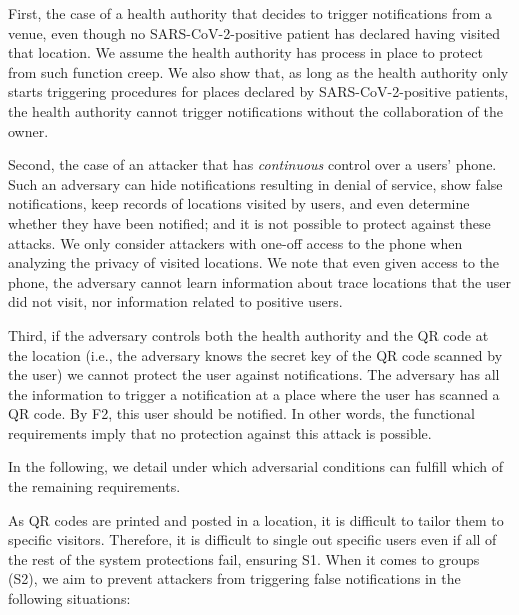 First, the case of a health authority that decides to trigger notifications from a venue, even though no SARS-CoV-2-positive patient has declared having visited that location. We assume the health authority has process in place to protect from such function creep. We also show that, as long as the health authority only starts triggering procedures for places declared by SARS-CoV-2-positive patients, the health authority cannot trigger notifications without the collaboration of the owner.

Second, the case of an attacker that has \emph{continuous} control over a users' phone. Such an adversary can hide notifications resulting in denial of service, show false notifications, keep records of locations visited by users, and even determine whether they have been notified; and it is not possible to protect against these attacks. We only consider attackers with one-off access to the phone when analyzing the privacy of visited locations. We note that even given access to the phone, the adversary cannot learn information about trace locations that the user did not visit, nor information related to positive users.
 
Third, if the adversary controls both the health authority and the QR code at the location (i.e., the adversary knows the secret key of the QR code scanned by the user) we cannot protect the user against notifications. The adversary has all the information to trigger a notification at a place where the user has scanned a QR code. By F2, this user should be notified. In other words, the functional requirements imply that no protection against this attack is possible.

In the following, we detail under which adversarial conditions \name can fulfill which of the remaining requirements.

 As QR codes are printed and posted in a location, it is difficult to tailor them to specific visitors. Therefore, it is difficult to single out specific users even if all of the rest of the system protections fail, ensuring S1. When it comes to groups (S2), we aim to prevent attackers from triggering false notifications in the following situations:

